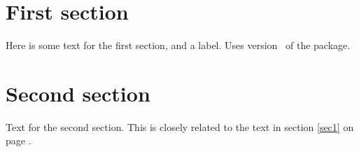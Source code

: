 \documentclass[twoside]{article}
\begin{document}
\makeRR   %
\section{First section}
Here is some text for the first section, and a label\label{sec1}.
Uses version \RRfileversion\ of the package.\newpage
\section{Second section}
Text for the second section. This is closely related to the text in
section \ref{sec1} on page \pageref{sec1}. \newpage
\tableofcontents
\end{document}

